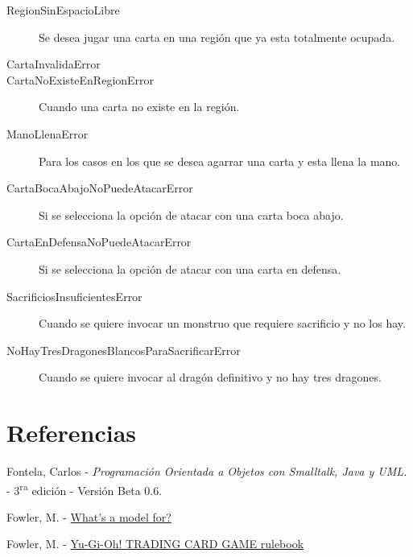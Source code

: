 \begin{description}

\item[RegionSinEspacioLibre] Se desea jugar una carta en una región que ya esta totalmente ocupada.

\item[CartaInvalidaError]

\item[CartaNoExisteEnRegionError] Cuando una carta no existe en la región.

\item[ManoLlenaError] Para los casos en los que se desea agarrar una carta y esta llena la mano.

\item[CartaBocaAbajoNoPuedeAtacarError] Si se selecciona la opción de atacar con una carta boca abajo.

\item[CartaEnDefensaNoPuedeAtacarError] Si se selecciona la opción de atacar con una carta en defensa.

\item[SacrificiosInsuficientesError] Cuando se quiere invocar un monstruo que requiere sacrificio y no los hay.

\item[NoHayTresDragonesBlancosParaSacrificarError] Cuando se quiere invocar al dragón definitivo y no hay tres dragones.

\end{description}

\appendix
\section{Referencias}
\begingroup
\renewcommand{\section}[2]{}
\begin{thebibliography}{10}
	 Fontela, Carlos - \emph{Programación Orientada a Objetos con Smalltalk, Java y UML.} - 3\textsuperscript{ra} edición - Versión Beta 0.6.
	
	 Fowler, M. - \hyperref{https://martinfowler.com/distributedComputing/purpose.pdf}{}{}{What's a model for?}
	
	 Fowler, M. - \hyperref{https://www.yugioh-card.com/en/rulebook/SD_RuleBook_EN_10.pdf}{}{}{Yu-Gi-Oh! TRADING CARD GAME rulebook}
\end{thebibliography}
\endgroup


